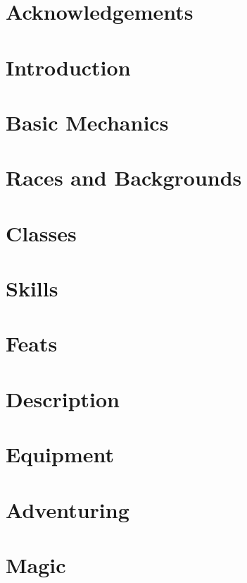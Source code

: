 \documentclass[twocolumn,oneside,letterpaper]{book}
\begin{document}
\setcounter{chapter}{-1}
\tableofcontents
\chapter*{Acknowledgements}


\chapter{Introduction}


\chapter{Basic Mechanics}


\chapter{Races and Backgrounds}


\chapter{Classes}


\chapter{Skills}


\chapter{Feats}\label{Feats}


\chapter{Description}


\chapter{Equipment}


\chapter{Adventuring}


\chapter{Magic}

\end{document}
